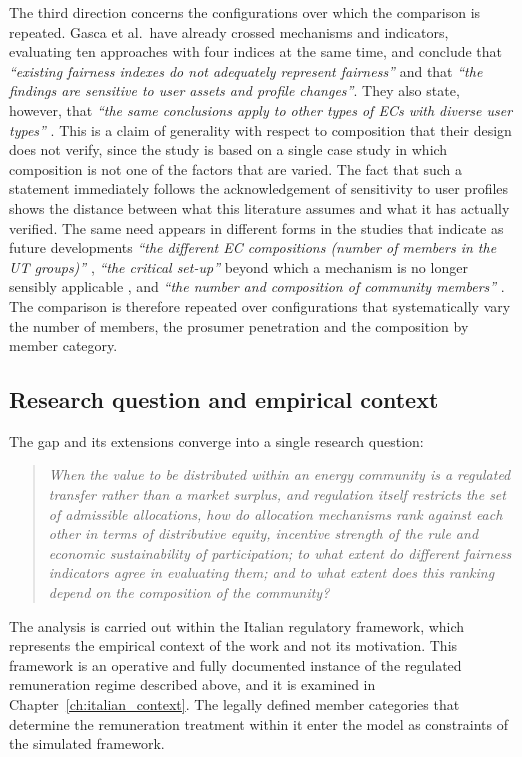 The third direction concerns the configurations over which the comparison is repeated. Gasca et al.\ have already crossed mechanisms and indicators, evaluating ten approaches with four indices at the same time, and conclude that \textit{``existing fairness indexes do not adequately represent fairness''} and that \textit{``the findings are sensitive to user assets and profile changes''}. They also state, however, that \textit{``the same conclusions apply to other types of ECs with diverse user types''} \cite{gasca2024}. This is a claim of generality with respect to composition that their design does not verify, since the study is based on a single case study in which composition is not one of the factors that are varied. The fact that such a statement immediately follows the acknowledgement of sensitivity to user profiles shows the distance between what this literature assumes and what it has actually verified. The same need appears in different forms in the studies that indicate as future developments \textit{``the different EC compositions (number of members in the UT groups)''} \cite{minutoLanzini2022}, \textit{``the critical set-up''} beyond which a mechanism is no longer sensibly applicable \cite{fina2024}, and \textit{``the number and composition of community members''} \cite{giudice2026}. The comparison is therefore repeated over configurations that systematically vary the number of members, the prosumer penetration and the composition by member category.

\subsection*{Research question and empirical context}

The gap and its extensions converge into a single research question:

\begin{quote}
\emph{When the value to be distributed within an energy community is a regulated transfer rather than a market surplus, and regulation itself restricts the set of admissible allocations, how do allocation mechanisms rank against each other in terms of distributive equity, incentive strength of the rule and economic sustainability of participation; to what extent do different fairness indicators agree in evaluating them; and to what extent does this ranking depend on the composition of the community?}
\end{quote}

The analysis is carried out within the Italian regulatory framework, which represents the empirical context of the work and not its motivation. This framework is an operative and fully documented instance of the regulated remuneration regime described above, and it is examined in Chapter~\ref{ch:italian_context}. The legally defined member categories that determine the remuneration treatment within it enter the model as constraints of the simulated framework.

